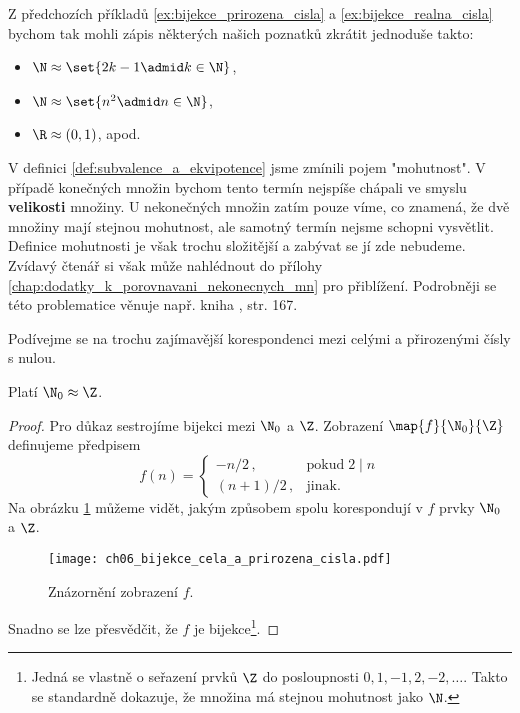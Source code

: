 Z předchozích příkladů \ref{ex:bijekce_prirozena_cisla} a \ref{ex:bijekce_realna_cisla} bychom tak mohli zápis některých našich poznatků zkrátit jednoduše takto:
\begin{itemize}
    \item $\N\approx\set{2k-1\admid k\in\N}$,
    \item $\N\approx\set{n^2\admid n\in\N}$,
    \item $\R\approx(0,1)$, apod.
\end{itemize}
V definici \ref{def:subvalence_a_ekvipotence} jsme zmínili pojem "mohutnost". V případě konečných množin bychom tento termín nejspíše chápali ve smyslu \textbf{velikosti} množiny. U nekonečných množin zatím pouze víme, co znamená, že dvě množiny mají stejnou mohutnost, ale samotný termín nejsme schopni vysvětlit. Definice mohutnosti je však trochu složitější a zabývat se jí zde nebudeme. Zvídavý čtenář si však může nahlédnout do přílohy \ref{chap:dodatky_k_porovnavani_nekonecnych_mn} pro přiblížení. Podrobněji se této problematice věnuje např. kniha \cite{Potter2009}, str. 167.\par
Podívejme se na trochu zajímavější korespondenci mezi celými a přirozenými čísly s nulou.
\begin{theorem}\label{thm:N_a_Z}
    Platí $\N_0\approx\Z$.
\end{theorem}
\begin{proof}
    Pro důkaz sestrojíme bijekci mezi $\N_0$ a $\Z$. Zobrazení $\map{f}{\N_0}{\Z}$ definujeme předpisem
    \begin{equation*}
        f(n)=\left\{
        \begin{array}{ll}
            -n/2\,, & \text{pokud}\;2\mid n\\
            (n+1)/2\,, & \text{jinak}.
        \end{array}
        \right.
    \end{equation*}
    Na obrázku \ref{fig:bijekce_cela_a_prirozena_cisla} můžeme vidět, jakým způsobem spolu korespondují v $f$ prvky $\N_0$ a $\Z$.
    \begin{figure}[H]
        \centering
        \texttt{[image: ch06\_bijekce\_cela\_a\_prirozena\_cisla.pdf]}
        \caption{Znázornění zobrazení $f$.}
        \label{fig:bijekce_cela_a_prirozena_cisla}
    \end{figure}
    Snadno se lze přesvědčit, že $f$ je bijekce\footnote{Jedná se vlastně o seřazení prvků $\Z$ do posloupnosti $0,1,-1,2,-2,\dots$. Takto se standardně dokazuje, že množina má stejnou mohutnost jako $\N$.}.
\end{proof}
